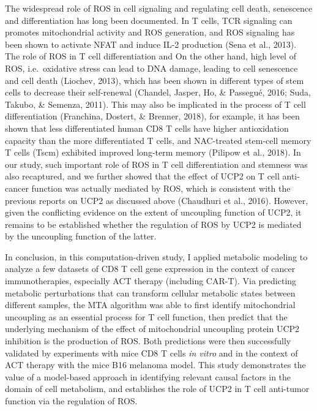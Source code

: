 \documentclass[12pt,twoside,openany,\mydriver]{thesis}  %
\begin{document}
The widespread role of ROS in cell signaling and regulating cell death, senescence and differentiation has long been documented. In T cells, TCR signaling can promotes mitochondrial activity and ROS generation, and ROS signaling has been shown to activate NFAT and induce IL-2 production (Sena et al., 2013). The role of ROS in T cell differentiation and On the other hand, high level of ROS, i.e.~oxidative stress can lead to DNA damage, leading to cell senescence and cell death (Liochev, 2013), which has been shown in different types of stem cells to decrease their self-renewal (Chandel, Jasper, Ho, \& Passegué, 2016; Suda, Takubo, \& Semenza, 2011). This may also be implicated in the process of T cell differentiation (Franchina, Dostert, \& Brenner, 2018), for example, it has been shown that less differentiated human CD8 T cells have higher antioxidation capacity than the more differentiated T cells, and NAC-treated stem-cell memory T cells (Tscm) exhibited improved long-term memory (Pilipow et al., 2018). In our study, such important role of ROS in T cell differentiation and stemness was also recaptured, and we further showed that the effect of UCP2 on T cell anti-cancer function was actually mediated by ROS, which is consistent with the previous reports on UCP2 as discussed above (Chaudhuri et al., 2016). However, given the conflicting evidence on the extent of uncoupling function of UCP2, it remains to be established whether the regulation of ROS by UCP2 is mediated by the uncoupling function of the latter.

In conclusion, in this computation-driven study, I applied metabolic modeling to analyze a few datasets of CD8 T cell gene expression in the context of cancer immunotherapies, especially ACT therapy (including CAR-T). Via predicting metabolic perturbations that can transform cellular metabolic states between different samples, the MTA algorithm was able to first identify mitochondrial uncoupling as an essential process for T cell function, then predict that the underlying mechanism of the effect of mitochondrial uncoupling protein UCP2 inhibition is the production of ROS. Both predictions were then successfully validated by experiments with mice CD8 T cells \emph{in vitro} and in the context of ACT therapy with the mice B16 melanoma model. This study demonstrates the value of a model-based approach in identifying relevant causal factors in the domain of cell metabolism, and establishes the role of UCP2 in T cell anti-tumor function via the regulation of ROS.
\end{document}
